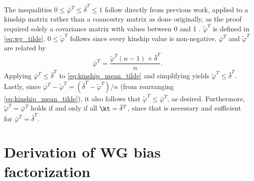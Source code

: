 \documentclass[11pt]{article}
\begin{document}
\begin{linenumbers}
\begin{appendices}
  The inequalities $0 \le \bar{\varphi}^T \le \bar{\delta}^T \le 1$ follow directly from previous work, applied to a kinship matrix rather than a coancestry matrix as done originally, as the proof required solely a covariance matrix with values between 0 and 1 \citep{ochoa_estimating_2021}.
  $\tilde{\varphi}^T$ is defined in \cref{eq:wg_tilde}.
  $0 \le \tilde{\varphi}^T$ follows since every kinship value is non-negative.
  $\bar{\varphi}^T$ and $\tilde{\varphi}^T$ are related by
  \begin{equation}
    \label{eq:kinship_mean_tilde}
    \bar{\varphi}^T
    =
    \frac{ \tilde{\varphi}^T (n-1) + \bar{\delta}^T }{n}.
  \end{equation}
  Applying $\bar{\varphi}^T \le \bar{\delta}^T$ to \cref{eq:kinship_mean_tilde} and simplifying yields $\tilde{\varphi}^T \le \bar{\delta}^T$.
  Lastly, since $\bar{\varphi}^T - \tilde{\varphi}^T = \left( \bar{\delta}^T - \tilde{\varphi}^T \right) / n$ (from rearranging \cref{eq:kinship_mean_tilde}), it also follows that $\tilde{\varphi}^T \le \bar{\varphi}^T$, as desired.
  Furthermore, $\tilde{\varphi}^T = \bar{\varphi}^T$ holds if and only if all $\kt = \bar{\delta}^T$, since that is necessary and sufficient for $\bar{\varphi}^T = \bar{\delta}^T$.

  \section{Derivation of WG bias factorization}
  
  \label{sec:wg_biasfunc}


\end{appendices}
\end{linenumbers}
\end{document}
